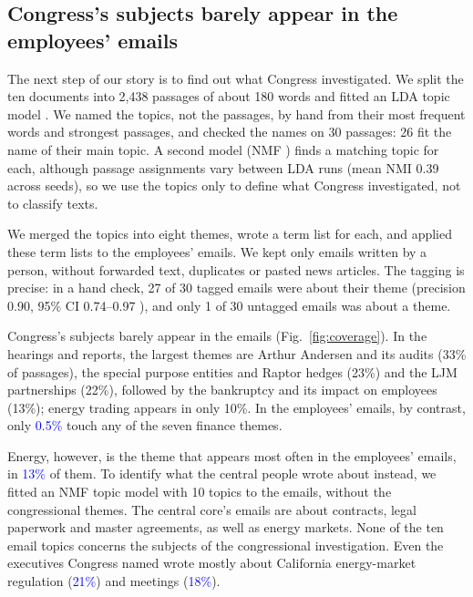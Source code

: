\documentclass[9pt,twocolumn,twoside]{pnas-new}
\newcommand{\chk}[1]{\textcolor{blue}{#1}}
\begin{document}
\subsection*{Congress's subjects barely appear in the employees' emails}
The next step of our story is to find out what Congress investigated. We split the ten
documents into 2,438 passages of about 180 words and fitted an LDA topic model
\cite{blei2003}. We named the topics, not the passages, by hand from their most frequent
words and strongest passages, and checked the names on 30 passages: 26 fit the name of their
main topic. A second model (NMF \cite{lee1999}) finds a matching topic for each, although
passage assignments vary between LDA runs (mean NMI 0.39 across seeds), so we use the topics
only to define what Congress investigated, not to classify texts.

We merged the topics into eight themes, wrote a term list for each, and applied these term
lists to the employees' emails. We kept only emails written by a person, without forwarded
text, duplicates or pasted news articles. The tagging is precise: in a hand check, 27 of 30
tagged emails were about their theme (precision 0.90, 95\% CI 0.74--0.97 \cite{wilson1927}),
and only 1 of 30 untagged emails was about a theme.

Congress's subjects barely appear in the emails (Fig.~\ref{fig:coverage}). In the hearings
and reports, the largest themes are Arthur Andersen and its audits (33\% of passages), the
special purpose entities and Raptor hedges (23\%) and the LJM partnerships (22\%), followed
by the bankruptcy and its impact on employees (13\%); energy trading appears in only 10\%. In
the employees' emails, by contrast, only \chk{0.5\%} touch any of the seven finance themes.

Energy, however, is the theme that appears most often in the employees' emails, in \chk{13\%}
of them. To identify what the central people wrote about instead, we fitted an NMF topic model
with 10 topics to the emails, without the congressional themes. The central core's emails are
about contracts, legal paperwork and master agreements, as well as energy markets. None of the
ten email topics concerns the subjects of the congressional investigation. Even the executives
Congress named wrote mostly about California energy-market regulation (\chk{21\%}) and
meetings (\chk{18\%}).
\end{document}
